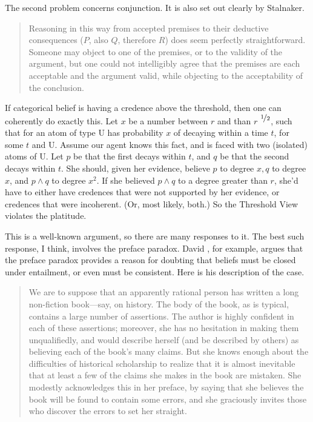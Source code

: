 The second problem concerns conjunction. It is also set out clearly by Stalnaker.

\begin{quote}
Reasoning in this way from accepted premises to their deductive consequences (\(P\), also \(Q\), therefore \(R\)) does seem perfectly straightforward. Someone may object to one of the premises, or to the validity of the argument, but one could not intelligibly agree that the premises are each acceptable and the argument valid, while objecting to the acceptability of the conclusion. \cite[92]{Stalnaker1984}
\end{quote}

\noindent If categorical belief is having a credence above the threshold, then one can coherently do exactly this. Let \(x\) be a number between \(r\) and than \(r\)\textsuperscript{ \(\nicefrac{1}{2}\)}, such that for an atom of type U has probability \(x\) of decaying within a time \(t\), for some \(t\) and U. Assume our agent knows this fact, and is faced with two (isolated) atoms of U. Let \(p\) be that the first decays within \(t\), and \(q\) be that the second decays within \(t\). She should, given her evidence, believe \(p\) to degree \(x, q\) to degree \(x\), and \(p \wedge q\) to degree \(x ^2\). If she believed \(p \wedge q\) to a degree greater than \(r\), she'd have to either have credences that were not supported by her evidence, or credences that were incoherent. (Or, most likely, both.) So the Threshold View violates the platitude. 

This is a well-known argument, so there are many responses to it. The best such response, I think, involves the preface paradox. David \cite{Christensen2005}, for example, argues that the preface paradox provides a reason for doubting that beliefs must be closed under entailment, or even must be consistent. Here is his description of the case.

\begin{quote}
We are to suppose that an apparently rational person has written a long non-fiction book---say, on history. The body of the book, as is typical, contains a large number of assertions. The author is highly confident in each of these assertions; moreover, she has no hesitation in making them unqualifiedly, and would describe herself (and be described by others) as believing each of the book's many claims. But she knows enough about the difficulties of historical scholarship to realize that it is almost inevitable that at least a few of the claims she makes in the book are mistaken. She modestly acknowledges this in her preface, by saying that she believes the book will be found to contain some errors, and she graciously invites those who discover the errors to set her straight. \citep[33-4]{Christensen2005}
\end{quote}

